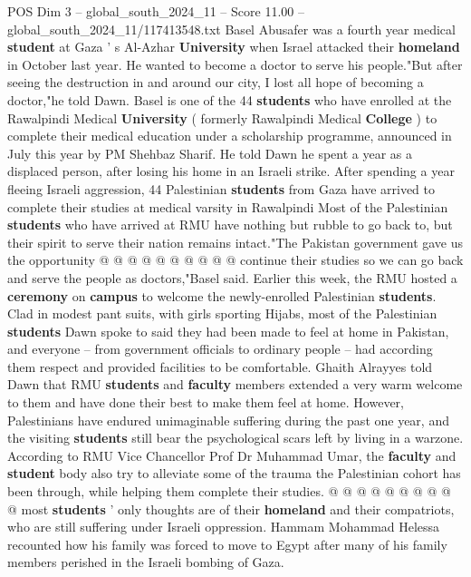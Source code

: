 \begin{textsample}{POS Dim 3 – global\_south\_2024\_11 – Score 11.00 – global\_south\_2024\_11/117413548.txt}  \label{ex:f3_pos_320}
Basel Abusafer was a fourth year medical \textbf{student} at Gaza ' s Al-Azhar \textbf{University} when Israel attacked their \textbf{homeland} in October last year.
He wanted to become a doctor to serve his people."But after seeing the destruction in and around our city, I lost all hope of becoming a doctor,"he told Dawn.
Basel is one of the 44 \textbf{students} who have enrolled at the Rawalpindi Medical \textbf{University} ( formerly Rawalpindi Medical \textbf{College} ) to complete their medical education under a scholarship programme, announced in July this year by PM Shehbaz Sharif.
He told Dawn he spent a year as a displaced person, after losing his home in an Israeli strike.
After spending a year fleeing Israeli aggression, 44 Palestinian \textbf{students} from Gaza have arrived to complete their studies at medical varsity in Rawalpindi Most of the Palestinian \textbf{students} who have arrived at RMU have nothing but rubble to go back to, but their spirit to serve their nation remains intact."The Pakistan government gave us the opportunity @ @ @ @ @ @ @ @ @ @ continue their studies so we can go back and serve the people as doctors,"Basel said.
Earlier this week, the RMU hosted a \textbf{ceremony} on \textbf{campus} to welcome the newly-enrolled Palestinian \textbf{students}.
Clad in modest pant suits, with girls sporting Hijabs, most of the Palestinian \textbf{students} Dawn spoke to said they had been made to feel at home in Pakistan, and everyone -- from government officials to ordinary people -- had according them respect and provided facilities to be comfortable.
Ghaith Alrayyes told Dawn that RMU \textbf{students} and \textbf{faculty} members extended a very warm welcome to them and have done their best to make them feel at home.
However, Palestinians have endured unimaginable suffering during the past one year, and the visiting \textbf{students} still bear the psychological scars left by living in a warzone.
According to RMU Vice Chancellor Prof Dr Muhammad Umar, the \textbf{faculty} and \textbf{student} body also try to alleviate some of the trauma the Palestinian cohort has been through, while helping them complete their studies. @ @ @ @ @ @ @ @ @ @ most \textbf{students} ' only thoughts are of their \textbf{homeland} and their compatriots, who are still suffering under Israeli oppression.
Hammam Mohammad Helessa recounted how his family was forced to move to Egypt after many of his family members perished in the Israeli bombing of Gaza.

\end{textsample}
